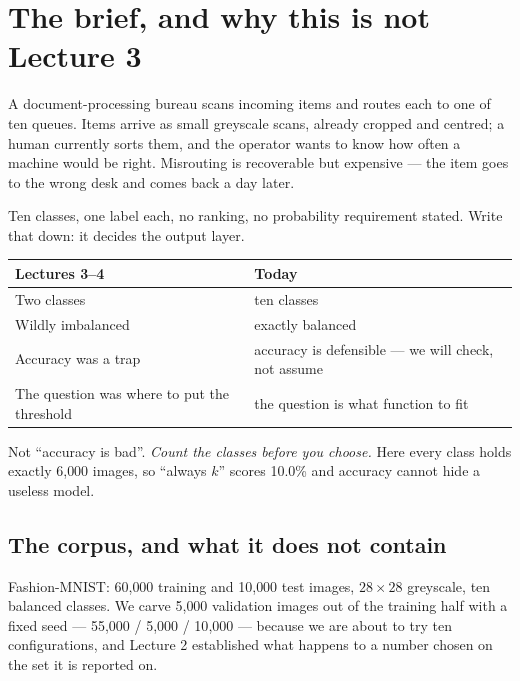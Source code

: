 \documentclass[11pt,a4paper]{article}
\begin{document}

\section{The brief, and why this is not Lecture 3}

A document-processing bureau scans incoming items and routes each to one of ten
queues. Items arrive as small greyscale scans, already cropped and centred; a
human currently sorts them, and the operator wants to know how often a machine
would be right. Misrouting is recoverable but expensive --- the item goes to the
wrong desk and comes back a day later.

Ten classes, one label each, no ranking, no probability requirement stated.
Write that down: it decides the output layer.

\begin{center}
\small
\begin{tabular}{p{}p{}}
\toprule
\textbf{Lectures 3--4} & \textbf{Today} \\
\midrule
Two classes & ten classes \\
Wildly imbalanced & exactly balanced \\
Accuracy was a trap & accuracy is defensible --- we will check, not assume \\
The question was where to put the threshold & the question is what function to
                                              fit \\
\bottomrule
\end{tabular}
\end{center}

\begin{keybox}[title={The habit worth keeping}]
Not ``accuracy is bad''. \emph{Count the classes before you choose.} Here every
class holds exactly 6{,}000 images, so ``always $k$'' scores 10.0\% and
accuracy cannot hide a useless model.
\end{keybox}

\subsection{The corpus, and what it does not contain}

Fashion-MNIST: 60{,}000 training and 10{,}000 test images, $28\times28$
greyscale, ten balanced classes. We carve 5{,}000 validation images out of the
training half with a fixed seed --- 55{,}000 / 5{,}000 / 10{,}000 --- because
we are about to try ten configurations, and Lecture 2 established what happens
to a number chosen on the set it is reported on.
\end{document}
